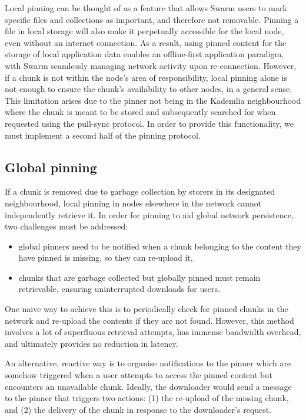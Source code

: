 Local pinning can be thought of as a feature that allows Swarm users to mark specific files and collections as important, and therefore not removable. Pinning a file in local storage will also make it perpetually accessible for the local node, even without an internet connection. As a result, using pinned content for the storage of local application data enables an offline-first application paradigm, with Swarm seamlessly managing network activity upon re-connection. However, if a chunk is not within the node's area of responsibility, local pinning alone is not enough to ensure the chunk's availability to other nodes, in a general sense. This limitation arises due to the pinner not being in the Kademlia neighbourhood where the chunk is meant to be stored and subsequently searched for when requested using the pull-sync protocol. In order to provide this functionality, we must implement a second half of the pinning protocol.

\subsection{Global pinning}\label{sec:global-pinning}

If a chunk is removed due to garbage collection by storers in its designated neighbourhood, local pinning in nodes elsewhere in the network cannot independently retrieve it. In order for pinning to aid global network persistence, two challenges must be addressed:

\begin{itemize}[noitemsep]
    \item  global pinners need to be notified when a chunk belonging to the content they have pinned is missing, so they can re-upload it,
    \item  chunks that are garbage collected but globally pinned must remain retrievable, ensuring uninterrupted downloads for users. 
\end{itemize}

One naive way to achieve this is to periodically check for pinned chunks in the network and re-upload the contents if they are not found. However, this method involves a lot of superfluous retrieval attempts, has immense bandwidth overhead, and ultimately provides no reduction in latency.

An alternative, reactive way is to organise notifications to the pinner which are somehow triggered when a user attempts to access the pinned content but encounters an unavailable chunk. Ideally, the downloader would send a message to the pinner that triggers two actions: (1) the re-upload of the missing chunk, and (2) the delivery of the chunk in response to the downloader's request.  

